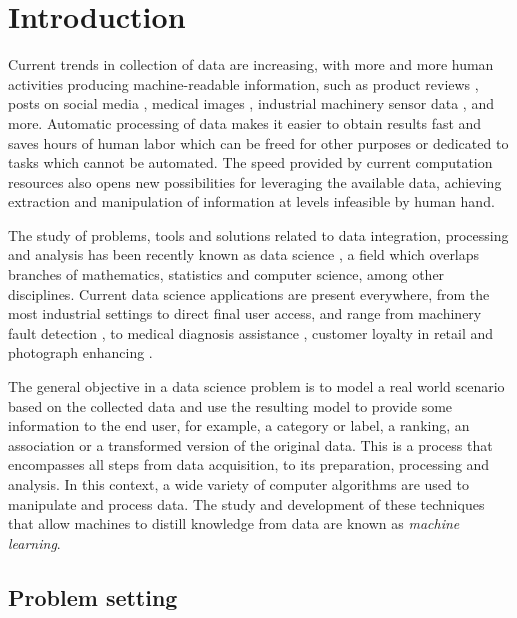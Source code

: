 \setchapterpreamble[u]{\margintoc}
\chapter{Introduction}


Current trends in collection of data are increasing, with more and more human activities producing machine-readable information, such as product reviews , posts on social media , medical images , industrial machinery sensor data , and more. Automatic processing of data makes it easier to obtain  results fast and saves hours of human labor which can be freed for other purposes or dedicated to tasks which cannot be automated. The speed provided by current computation resources also opens new possibilities for leveraging the available data, achieving extraction and manipulation of information at levels infeasible by human hand.

The study of problems, tools and solutions related to data integration, processing and analysis has been recently known as data science , a field which overlaps branches of mathematics, statistics and computer science, among other disciplines. Current data science applications are present everywhere, from the most industrial settings to direct final user access, and range from machinery fault detection , to medical diagnosis assistance , customer loyalty in retail  and photograph enhancing .

The general objective in a data science problem is to model a real world scenario based on the collected data and use the resulting model to provide some information to the end user, for example, a category or label, a ranking, an association or a transformed version of the original data. This is a process that encompasses all steps from data acquisition, to its preparation, processing and analysis. In this context, a wide variety of computer algorithms are used to manipulate and process data. The study and development of these techniques that allow machines to distill knowledge from data are known as \textit{machine learning}.

\section{Problem setting}

